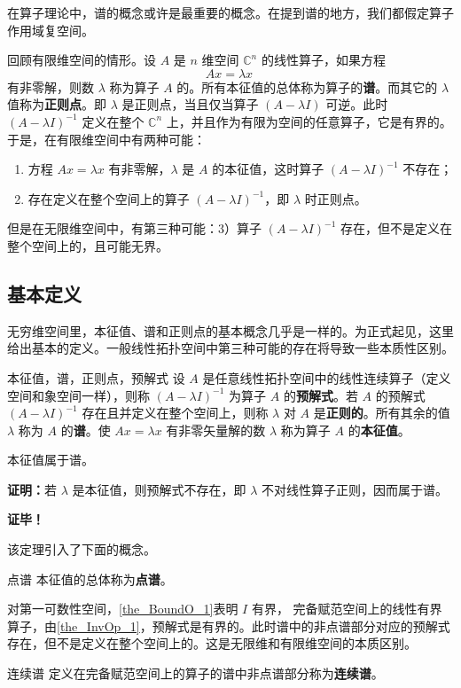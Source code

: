 
\cite{Ke1}在算子理论中，谱的概念或许是最重要的概念。在提到谱的地方，我们都假定算子作用域复空间。

回顾有限维空间的情形。设 $A$ 是 $n$ 维空间 $\mathbb C^n$ 的线性算子，如果方程
\begin{equation}
Ax=\lambda x~
\end{equation}
有非零解，则数 $\lambda$ 称为算子 $A$ 的。所有本征值的总体称为算子的\textbf{谱}。而其它的 $\lambda$ 值称为\textbf{正则点}。即 $\lambda$ 是正则点，当且仅当算子 $(A-\lambda I)$ 可逆。此时 $(A-\lambda I)^{-1}$ 定义在整个 $\mathbb C^n$ 上，并且作为有限为空间的任意算子，它是有界的。于是，在有限维空间中有两种可能：
\begin{enumerate}
\item 方程 $Ax=\lambda x$ 有非零解，$\lambda$ 是 $A$ 的本征值，这时算子 $(A-\lambda I)^{-1}$ 不存在；
\item 存在定义在整个空间上的算子 $(A-\lambda I)^{-1}$，即 $\lambda$ 时正则点。
\end{enumerate}

但是在无限维空间中，有第三种可能：3）算子 $(A-\lambda I)^{-1}$ 存在，但不是定义在整个空间上的，且可能无界。
\subsection{基本定义}
无穷维空间里，本征值、谱和正则点的基本概念几乎是一样的。为正式起见，这里给出基本的定义。一般线性拓扑空间中第三种可能的存在将导致一些本质性区别。
\begin{definition}{本征值，谱，正则点，预解式}
设 $A$ 是任意线性拓扑空间中的线性连续算子（定义空间和象空间一样），则称 $(A-\lambda I)^{-1}$ 为算子 $A$ 的\textbf{预解式}。若 $A$ 的预解式 $(A-\lambda I)^{-1}$ 存在且并定义在整个空间上，则称 $\lambda$ 对 $A$ 是\textbf{正则的}。所有其余的值 $\lambda$ 称为 $A$ 的\textbf{谱}。使 $Ax=\lambda x$ 有非零矢量解的数 $\lambda$ 称为算子 $A$ 的\textbf{本征值}。
\end{definition}

\begin{theorem}{}
本征值属于谱。
\end{theorem}

\textbf{证明：}若 $\lambda$ 是本征值，则预解式不存在，即 $\lambda$ 不对线性算子正则，因而属于谱。

\textbf{证毕！}

该定理引入了下面的概念。
\begin{definition}{点谱}
本征值的总体称为\textbf{点谱}。
\end{definition}

对第一可数性空间，\autoref{the_BoundO_1}表明 $I$ 有界， 完备赋范空间上的线性有界算子，由\autoref{the_InvOp_1}，预解式是有界的。此时谱中的非点谱部分对应的预解式存在，但不是定义在整个空间上的。这是无限维和有限维空间的本质区别。

\begin{definition}{连续谱}
定义在完备赋范空间上的算子的谱中非点谱部分称为\textbf{连续谱}。
\end{definition}


